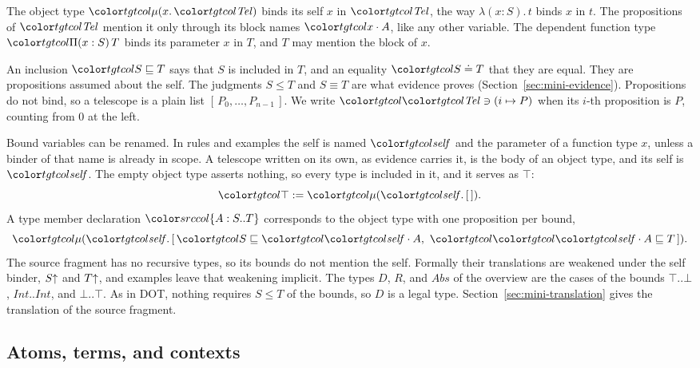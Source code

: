 The object type $\obj[x]{\tel}$ binds its self $x$ in $\tel$, the way $\lambda(x : S).\,t$ binds $x$ in $t$. The propositions of $\tel$ mention it only through its block names $\sel{x}{A}$, like any other variable. The dependent function type $\pit[x]{S}{T}$ binds its parameter $x$ in $T$, and $T$ may mention the block of $x$.

An inclusion $\ple{S}{T}$ says that $S$ is included in $T$, and an equality $\peq{S}{T}$ that they are equal. They are propositions assumed about the self. The judgments $S \le T$ and $S \equiv T$ are what evidence proves (Section~\ref{sec:mini-evidence}). Propositions do not bind, so a telescope is a plain list $[\,P_0, \ldots, P_{n-1}\,]$. We write $\tat{\tel}{i}{P}$ when its $i$-th proposition is $P$, counting from $0$ at the left.

Bound variables can be renamed. In rules and examples the self is named $\self$ and the parameter of a function type $x$, unless a binder of that name is already in scope. A telescope written on its own, as evidence carries it, is the body of an object type, and its self is $\self$. The empty object type asserts nothing, so every type is included in it, and it serves as $\top$:
\[
\tgt{\top} \mathrel{:=} \obj{\tnil} .
\]
A type member declaration $\dtyp{A}{S}{T}$ corresponds to the object type with one proposition per bound,
\[
\obj{[\,\ple{S}{\sel{\self}{A}},\ \ple{\sel{\self}{A}}{T}\,]} .
\]
The source fragment has no recursive types, so its bounds do not mention the self. Formally their translations are weakened under the self binder, $S{\uparrow}$ and $T{\uparrow}$, and examples leave that weakening implicit. The types $D$, $R$, and $\mathit{Abs}$ of the overview are the cases of the bounds $\top..\bot$, $\mathit{Int}..\mathit{Int}$, and $\bot..\top$. As in DOT, nothing requires $S \le T$ of the bounds, so $D$ is a legal type. Section~\ref{sec:mini-translation} gives the translation of the source fragment.

\FloatBarrier
\subsection{Atoms, terms, and contexts}\label{sec:mini-terms}

